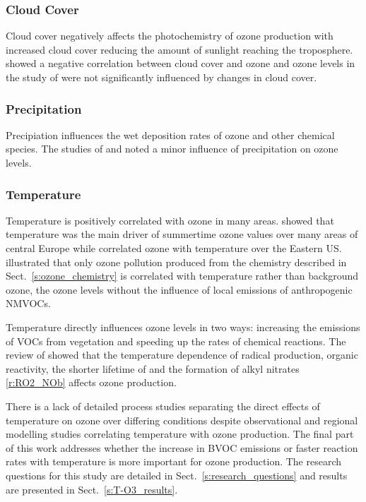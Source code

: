 \newpage
\subsubsection{Cloud Cover}
Cloud cover negatively affects the photochemistry of ozone production with increased cloud cover reducing the amount of sunlight reaching the troposphere.
\citet{Korsog:1991} showed a negative correlation between cloud cover and ozone and ozone levels in the study of \citet{Dawson:2007} were not significantly influenced by changes in cloud cover.

\vspace{-1cm}
\subsubsection{Precipitation}
Precipiation influences the wet deposition rates of ozone and other chemical species.
The studies of \citet{Dawson:2007} and \citet{Murazaki:2006} noted a minor influence of precipitation on ozone levels.

\vspace{-1cm}
\subsubsection{Temperature}
Temperature is positively correlated with ozone in many areas.
\citet{Otero:2016} showed that temperature was the main driver of summertime ozone values over many areas of central Europe while \citet{Camalier:2007} correlated ozone with temperature over the Eastern US.
\citet{Sillman:1995a} illustrated that only ozone pollution produced from the chemistry described in Sect.~\ref{s:ozone_chemistry} is correlated with temperature rather than background ozone, the ozone levels without the influence of local emissions of anthropogenic NMVOCs.

Temperature directly influences ozone levels in two ways: increasing the emissions of VOCs from vegetation and speeding up the rates of chemical reactions.
The review of \citet{Pusede:2015} showed that the temperature dependence of radical production, organic reactivity, the shorter lifetime of  and the formation of alkyl nitrates \eqref{r:RO2_NOb} affects ozone production.

There is a lack of detailed process studies separating the direct effects of temperature on ozone over differing  conditions despite observational and regional modelling studies correlating temperature with ozone production. 
The final part of this work addresses whether the increase in BVOC emissions or faster reaction rates with temperature is more important for ozone production.
The research questions for this study are detailed in Sect.~\ref{s:research_questions} and results are presented in Sect.~\ref{s:T-O3_results}.

